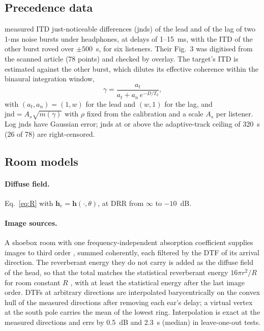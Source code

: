 \documentclass[11pt]{article}
\begin{document}
\subsection{Precedence data}
\citet{litovsky2001} measured ITD just-noticeable differences (jnds) of the lead and of the lag of two 1-ms noise bursts under headphones, at delays of 1--15~ms, with the ITD of the other burst roved over $\pm500$~\textmu s, for six listeners. Their Fig.~3 was digitised from the scanned article (78 points) and checked by overlay. The target's ITD is estimated against the other burst, which dilutes its effective coherence within the binaural integration window,
\begin{equation}
\gamma=\frac{a_t}{a_t+a_n\,e^{-D/T_b}},
\end{equation}
with $(a_t,a_n)=(1,w)$ for the lead and $(w,1)$ for the lag, and $\mathrm{jnd}=A_s\sqrt{m(\gamma)}$ with $\rho$ fixed from the calibration and a scale $A_s$ per listener. Log jnds have Gaussian error; jnds at or above the adaptive-track ceiling of 320~\textmu s (26 of 78) are right-censored.

\subsection{Room models}
\paragraph{Diffuse field.} Eq.~\eqref{eq:R} with $\bm h_e=\bm h(\cdot,\theta)$, at DRR from $\infty$ to $-10$~dB.
\paragraph{Image sources.} A shoebox room with one frequency-independent absorption coefficient supplies images to third order \citep{allen1979}, summed coherently, each filtered by the DTF of its arrival direction. The reverberant energy they do not carry is added as the diffuse field of the head, so that the total matches the statistical reverberant energy $16\pi r^2/R$ for room constant $R$ \citep{kuttruff2016}, with at least the statistical energy after the last image order. DTFs at arbitrary directions are interpolated barycentrically on the convex hull of the measured directions after removing each ear's delay; a virtual vertex at the south pole carries the mean of the lowest ring. Interpolation is exact at the measured directions and errs by 0.5~dB and 2.3~\textmu s (median) in leave-one-out tests.
\end{document}
